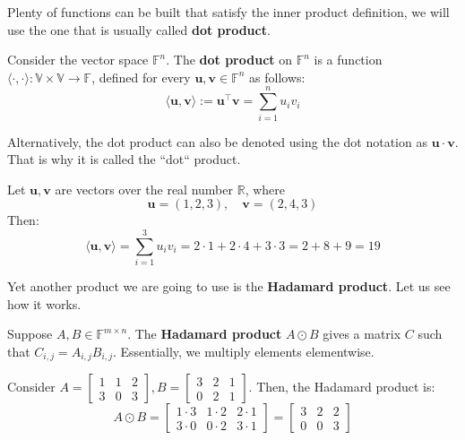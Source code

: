\documentclass[../lecture-notes.tex]{subfiles}
\begin{document}
Plenty of functions can be built that satisfy the inner product definition, we will use the one that
is usually called \textbf{dot product}.
\begin{definition}
    Consider the vector space $\mathbb{F}^n$. The \textbf{dot product} on $\mathbb{F}^n$ is a function $\langle \cdot, \cdot \rangle: \mathbb{V} \times \mathbb{V} \rightarrow \mathbb{F}$, 
    defined for every $\mathbf{u}, \mathbf{v} \in \mathbb{F}^n$ as follows:
    \begin{equation*}
        \langle \mathbf{u}, \mathbf{v} \rangle := \mathbf{u}^{\top}\mathbf{v} = \sum_{i=1}^{n} u_i v_i
    \end{equation*}

    Alternatively, the dot product can also be denoted using the dot notation as $\mathbf{u} \cdot \mathbf{v}$. That is why it is called the ``dot`` product.
\end{definition}

\begin{example}
    Let $\mathbf{u}, \mathbf{v}$ are vectors over the real number $\mathbb{R}$, where
    \begin{equation*}
        \mathbf{u} = (1, 2, 3), \quad \mathbf{v} = (2, 4, 3)
    \end{equation*}
    Then: 
    \begin{equation*}
        \langle \mathbf{u}, \mathbf{v}\rangle = \sum_{i=1}^{3}u_iv_i = 2 \cdot 1 + 2 \cdot 4 + 3 \cdot 3 = 2 + 8 + 9 = 19
    \end{equation*}
\end{example}

Yet another product we are going to use is the \textbf{Hadamard product}. Let us see how it works.
\begin{definition}
    Suppose $A,B \in \mathbb{F}^{m \times n}$. The \textbf{Hadamard product} $A \odot B$ gives a matrix $C$ such that $C_{i,j} = A_{i,j}B_{i,j}$. Essentially, we multiply elements elementwise.
\end{definition}

\begin{example}
    Consider $A = \begin{bmatrix}
        1 & 1 & 2 \\
        3 & 0 & 3
    \end{bmatrix}, B = \begin{bmatrix}
        3 & 2 & 1 \\ 0 & 2 & 1
    \end{bmatrix}$. Then, the Hadamard product is:
    \begin{equation*}
        A \odot B = \begin{bmatrix}
            1 \cdot 3 & 1 \cdot 2 & 2 \cdot 1 \\
            3 \cdot 0 & 0 \cdot 2 & 3 \cdot 1
        \end{bmatrix} = \begin{bmatrix}
            3 & 2 & 2 \\
            0 & 0 & 3
        \end{bmatrix}
    \end{equation*}
\end{example}
\end{document}
